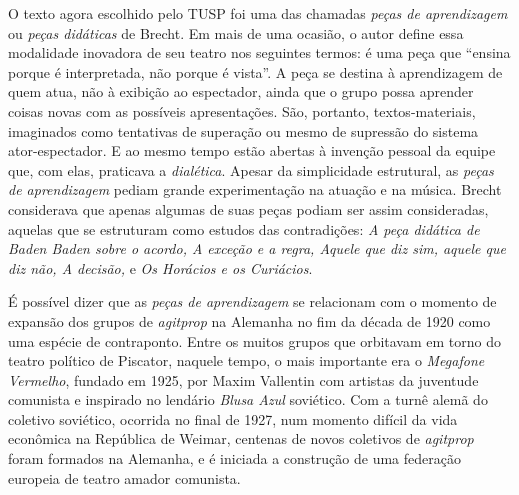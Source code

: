 O texto agora escolhido pelo TUSP foi uma das chamadas \textit{peças de
aprendizagem} ou \textit{peças didáticas} de Brecht. Em mais de uma
ocasião, o autor define essa modalidade inovadora de seu teatro nos
seguintes termos: é uma peça que “ensina porque é interpretada, não
porque é vista”. A peça se destina à aprendizagem de quem atua, não à
exibição ao espectador, ainda que o grupo possa aprender coisas novas
com as possíveis apresentações. São, portanto, textos-materiais,
imaginados como tentativas de superação ou mesmo de supressão do sistema
ator-espectador. E ao mesmo tempo estão abertas à invenção pessoal da
equipe que, com elas, praticava a \textit{dialética}. Apesar da
simplicidade estrutural, as \textit{peças de aprendizagem} pediam grande
experimentação na atuação e na música. Brecht considerava que apenas
algumas de suas peças podiam ser assim consideradas, aquelas que se
estruturam como estudos das contradições: \textit{A peça didática de Baden
Baden sobre o acordo, A exceção e a regra, Aquele que diz sim, aquele
que diz não, A decisão,} e \textit{Os Horácios e os Curiácios}.

É possível dizer que as \textit{peças de aprendizagem} se relacionam com o
momento de expansão dos grupos de \textit{agitprop} na Alemanha no fim da
década de 1920 como uma espécie de contraponto. Entre os muitos grupos
que orbitavam em torno do teatro político de Piscator, naquele tempo, o
mais importante era o \textit{Megafone Vermelho}, fundado em 1925, por
Maxim Vallentin com artistas da juventude comunista e inspirado no
lendário \textit{Blusa Azul} soviético. Com a turnê alemã do coletivo
soviético, ocorrida no final de 1927, num momento difícil da vida
econômica na República de Weimar, centenas de novos coletivos de
\textit{agitprop} foram formados na Alemanha, e é iniciada a construção de
uma federação europeia de teatro amador comunista.

